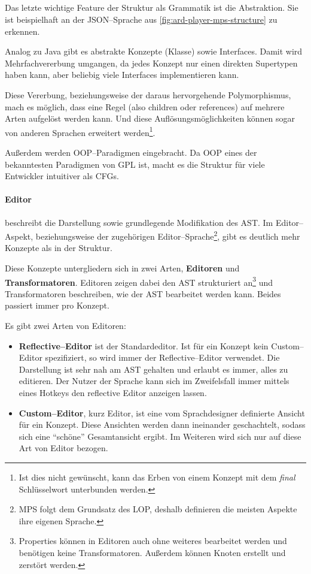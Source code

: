 \subparagraph*{}
Das letzte wichtige Feature der Struktur als Grammatik ist die Abstraktion.
Sie ist beispielhaft an der \ac{JSON}--Sprache aus \autoref{fig:ard-player-mps-structure} zu erkennen.

Analog zu Java gibt es abstrakte Konzepte (Klasse) sowie Interfaces.
Damit wird Mehrfachvererbung umgangen, da jedes Konzept nur einen direkten Supertypen haben kann, aber beliebig viele Interfaces implementieren kann.

Diese Vererbung, beziehungsweise der daraus hervorgehende Polymorphismus, mach es möglich, dass eine Regel (also {\ttfamily children} oder {\ttfamily references}) auf mehrere Arten aufgelöst werden kann.
Und diese Auflösungsmöglichkeiten können sogar von anderen Sprachen erweitert werden\footnote{Ist dies nicht gewünscht, kann das Erben von einem Konzept mit dem \textit{final} Schlüsselwort unterbunden werden.}.

Außerdem werden \acs{OOP}--Paradigmen eingebracht.
Da \ac{OOP} eines der bekanntesten Paradigmen von \ac{GPL} ist, macht es die Struktur für viele Entwickler intuitiver als \acp{CFG}.

\paragraph{Editor} beschreibt die Darstellung sowie grundlegende Modifikation des \ac{AST}.
Im Editor--Aspekt, beziehungsweise der zugehörigen Editor--Sprache\footnote{\ac{MPS} folgt dem Grundsatz des \ac{LOP}, deshalb definieren die meisten Aspekte ihre eigenen Sprache.}, gibt es deutlich mehr Konzepte als in der Struktur.

Diese Konzepte untergliedern sich in zwei Arten, \textbf{Editoren} und \textbf{Transformatoren}.
Editoren zeigen dabei den \ac{AST} strukturiert an\footnote{Properties können in Editoren auch ohne weiteres bearbeitet werden und benötigen keine Transformatoren. Außerdem können Knoten erstellt und zerstört werden.} und Transformatoren beschreiben, wie der \ac{AST} bearbeitet werden kann.
Beides passiert immer pro Konzept.

Es gibt zwei Arten von Editoren:
\begin{itemize}
    \item \textbf{Reflective--Editor} ist der Standardeditor.
    Ist für ein Konzept kein Custom--Editor spezifiziert, so wird immer der Reflective--Editor verwendet.
    Die Darstellung ist sehr nah am \ac{AST} gehalten und erlaubt es immer, alles zu editieren.
    Der Nutzer der Sprache kann sich im Zweifelsfall immer mittels eines Hotkeys den reflective Editor anzeigen lassen.
    \item \textbf{Custom--Editor}, kurz Editor, ist eine vom Sprachdesigner definierte Ansicht für ein Konzept.
    Diese Ansichten werden dann ineinander geschachtelt, sodass sich eine \enquote{schöne} Gesamtansicht ergibt.
    Im Weiteren wird sich nur auf diese Art von Editor bezogen.
\end{itemize}

